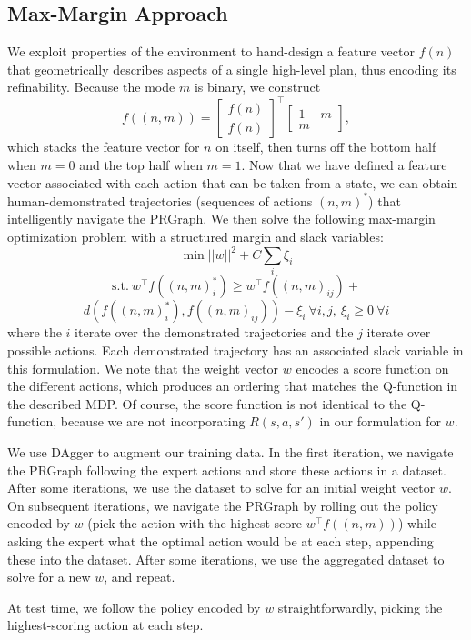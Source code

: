 \subsection{Max-Margin Approach}
We exploit properties of the environment to hand-design a feature vector $f(n)$ that geometrically
describes aspects of a single high-level plan, thus encoding its refinability. Because the mode $m$ is binary,
we construct $$f((n, m)) = \begin{bmatrix} f(n) \\ f(n) \end{bmatrix}^\top \begin{bmatrix} 1 - m \\ m \end{bmatrix},$$
which stacks the feature vector for $n$ on itself, then turns off the bottom half when $m = 0$ and the
top half when $m = 1$. Now that we have defined a feature vector associated with each action that can be taken
from a state, we can obtain human-demonstrated trajectories (sequences of actions $(n, m)^{*}$) that intelligently
navigate the PRGraph. We then solve the following max-margin optimization problem with a structured margin and slack variables:
$$\min ||w||^{2} + C\sum_{i} \xi_{i}$$
$$\text{s.t.}\ w^{\top}f((n, m)_{i}^{*}) \geq w^{\top}f((n, m)_{ij}) + $$
$$d(f((n, m)_{i}^{*}), f((n, m)_{ij})) - \xi_{i}\ \forall i, j,\ \xi_{i} \geq 0\ \forall i$$
where the $i$ iterate over the demonstrated trajectories and the $j$ iterate over possible actions. Each
demonstrated trajectory has an associated slack variable in this formulation.
We note that the weight vector $w$ encodes a score function on the different actions, which produces
an ordering that matches the Q-function in the described MDP. Of course, the score function is not identical
to the Q-function, because we are not incorporating $R(s, a, s')$ in our formulation for $w$.

We use DAgger to augment our training data. In the first iteration, we navigate the PRGraph following
the expert actions and store these actions in a dataset. After some iterations, we use the dataset to solve for an
initial weight vector $w$. On subsequent iterations, we navigate the PRGraph by rolling out the policy
encoded by $w$ (pick the action with the highest score $w^{\top}f((n, m))$) while asking the expert what
the optimal action would be at each step, appending these into the dataset. After some iterations, we use the
aggregated dataset to solve for a new $w$, and repeat.

At test time, we follow the policy encoded by $w$ straightforwardly, picking the highest-scoring action
at each step.

